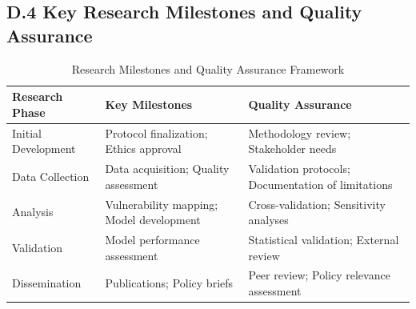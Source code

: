 \graphicspath{{./}{./sections/images/}{./images/}}\documentclass[12pt,a4paper,landscape]{article}
\begin{document}
\subsection*{D.4 Key Research Milestones and Quality Assurance}
\begin{table}[H]
    \centering
    \caption{Research Milestones and Quality Assurance Framework}
    \label{tab:milestones_qa}
    \begin{tabular}{L{3cm}L{6cm}L{6cm}}
        \toprule
        \textbf{Research Phase} & \textbf{Key Milestones} & \textbf{Quality Assurance} \\
        \midrule
        Initial Development & 
        Protocol finalization; Ethics approval & 
        Methodology review; Stakeholder needs \\
        \addlinespace
        Data Collection & 
        Data acquisition; Quality assessment & 
        Validation protocols; Documentation of limitations \\
        \addlinespace
        Analysis & 
        Vulnerability mapping; Model development & 
        Cross-validation; Sensitivity analyses \\
        \addlinespace
        Validation & 
        Model performance assessment & 
        Statistical validation; External review \\
        \addlinespace
        Dissemination & 
        Publications; Policy briefs & 
        Peer review; Policy relevance assessment \\
        \bottomrule
    \end{tabular}
\end{table}
\end{document}
